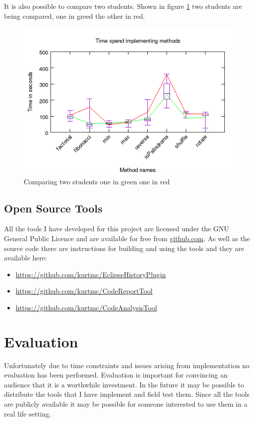 \documentclass[twocolumn]{article}
\begin{document}
It is also possible to compare two students. Shown in figure \ref{fig:student2}
two students are being compared, one in greed the other in red.

\begin{figure}[h!bt]
\includegraphics[width=\linewidth]{figures/student2}
\caption{Comparing two students one in green one in red}
\label{fig:student2}
\end{figure}

\subsection{Open Source Tools}
All the tools I have developed for this project are licensed under the GNU
General Public Licence and are available for free from \url{github.com}. As
well as the source code there are instructions for building and using the tools
and they are available here:
{\footnotesize
\begin{itemize}
\item \url{https://github.com/kurtmc/EclipseHistoryPlugin}
\item \url{https://github.com/kurtmc/CodeReportTool}
\item \url{https://github.com/kurtmc/CodeAnalysisTool}
\end{itemize}
}


\section{Evaluation}
Unfortunately due to time constraints and issues arising from implementation no
evaluation has been performed. Evaluation is important for convincing an
audience that it is a worthwhile investment. In the future it may be possible
to distribute the tools that I have implement and field test them. Since all
the tools are publicly available it may be possible for someone interested to
use them in a real life setting.
\end{document}

